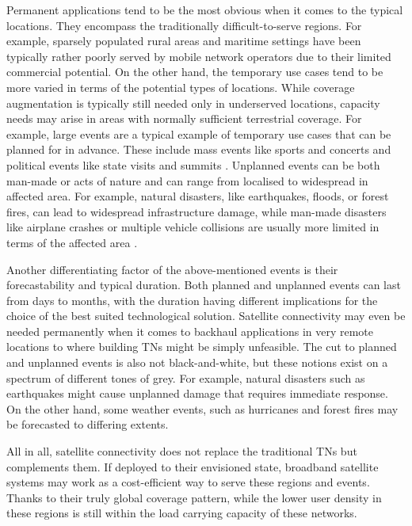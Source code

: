 \documentclass[english, 12pt, a4paper, elec, utf8, a-1b, online]{aaltothesis}
\begin{document}
Permanent applications tend to be the most obvious when it comes to the typical locations. They encompass the traditionally difficult-to-serve regions.
For example, sparsely populated rural areas and maritime settings have been typically rather poorly served by mobile network operators due to their limited commercial potential.
On the other hand, the temporary use cases tend to be more varied in terms of the potential types of locations. While coverage augmentation is typically still needed only in underserved locations, capacity needs may arise in areas with normally sufficient terrestrial coverage.
For example, large events are a typical example of temporary use cases that can be planned for in advance. These include mass events like sports and concerts and political events like state visits and summits \cite{erve2018trump, tcca2021airbus, airbus2023bahrain}.
Unplanned events can be both man-made or acts of nature and can range from localised to widespread in affected area. For example, natural disasters, like earthquakes, floods, or forest fires, can lead to widespread infrastructure damage, while man-made disasters like airplane crashes or multiple vehicle collisions are usually more limited in terms of the affected area \cite{firstnet2021wildfire, firstnet2021nashville}.

Another differentiating factor of the above-mentioned events is their forecastability and typical duration.
Both planned and unplanned events can last from days to months, with the duration having different implications for the choice of the best suited technological solution.
Satellite connectivity may even be needed permanently when it comes to backhaul applications in very remote locations to where building TNs might be simply unfeasible.
The cut to planned and unplanned events is also not black-and-white, but these notions exist on a spectrum of different tones of grey.
For example, natural disasters such as earthquakes might cause unplanned damage that requires immediate response.
On the other hand, some weather events, such as hurricanes and forest fires may be forecasted to differing extents.

All in all, satellite connectivity does not replace the traditional TNs but complements them. If deployed to their envisioned state, broadband satellite systems may work as a cost-efficient way to serve these regions and events. Thanks to their truly global coverage pattern, while the lower user density in these regions is still within the load carrying capacity of these networks.
\end{document}
